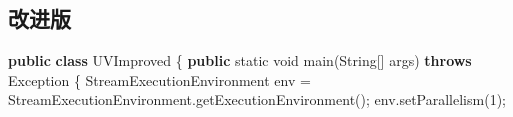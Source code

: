 \documentclass[cn,11pt,chinese]{elegantbook}
\newenvironment{Shaded}{}{}
\newcommand{\BuiltInTok}[1]{#1}
\newcommand{\DataTypeTok}[1]{\textcolor[rgb]{0.56,0.13,0.00}{#1}}
\newcommand{\DecValTok}[1]{\textcolor[rgb]{0.25,0.63,0.44}{#1}}
\newcommand{\FunctionTok}[1]{\textcolor[rgb]{0.02,0.16,0.49}{#1}}
\newcommand{\KeywordTok}[1]{\textcolor[rgb]{0.00,0.44,0.13}{\textbf{#1}}}
\newcommand{\NormalTok}[1]{#1}
\begin{document}
\hypertarget{ux6539ux8fdbux7248}{%
\subsection{改进版}\label{ux6539ux8fdbux7248}}

\begin{Shaded}
\begin{Highlighting}[]
\KeywordTok{public} \KeywordTok{class}\NormalTok{ UVImproved \{}
    \KeywordTok{public} \DataTypeTok{static} \DataTypeTok{void} \FunctionTok{main}\NormalTok{(}\BuiltInTok{String}\NormalTok{[] args) }\KeywordTok{throws} \BuiltInTok{Exception}\NormalTok{ \{}
\NormalTok{        StreamExecutionEnvironment env = StreamExecutionEnvironment.}\FunctionTok{getExecutionEnvironment}\NormalTok{();}
\NormalTok{        env.}\FunctionTok{setParallelism}\NormalTok{(}\DecValTok{1}\NormalTok{);}


\end{Highlighting}
\end{Shaded}
\end{document}
